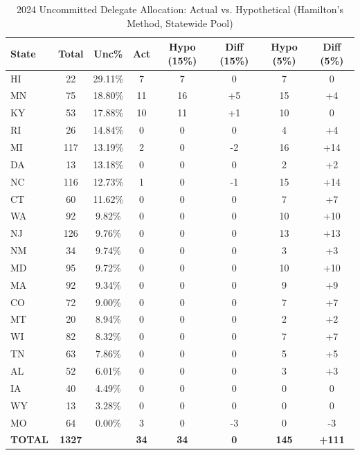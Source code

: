\begin{table}[ht]
\centering
\begin{tabular}{|l|c|c|c|c|c|c|c|}
\hline
\textbf{State} & \textbf{Total} & \textbf{Unc\%} & \textbf{Act} & \textbf{Hypo (15\%)} & \textbf{Diff (15\%)} & \textbf{Hypo (5\%)} & \textbf{Diff (5\%)} \\
\hline
HI & 22 & 29.11\% & 7 & 7 & 0 & 7 & 0 \\
MN & 75 & 18.80\% & 11 & 16 & +5 & 15 & +4 \\
KY & 53 & 17.88\% & 10 & 11 & +1 & 10 & 0 \\
RI & 26 & 14.84\% & 0 & 0 & 0 & 4 & +4 \\
MI & 117 & 13.19\% & 2 & 0 & -2 & 16 & +14 \\
DA & 13 & 13.18\% & 0 & 0 & 0 & 2 & +2 \\
NC & 116 & 12.73\% & 1 & 0 & -1 & 15 & +14 \\
CT & 60 & 11.62\% & 0 & 0 & 0 & 7 & +7 \\
WA & 92 & 9.82\% & 0 & 0 & 0 & 10 & +10 \\
NJ & 126 & 9.76\% & 0 & 0 & 0 & 13 & +13 \\
NM & 34 & 9.74\% & 0 & 0 & 0 & 3 & +3 \\
MD & 95 & 9.72\% & 0 & 0 & 0 & 10 & +10 \\
MA & 92 & 9.34\% & 0 & 0 & 0 & 9 & +9 \\
CO & 72 & 9.00\% & 0 & 0 & 0 & 7 & +7 \\
MT & 20 & 8.94\% & 0 & 0 & 0 & 2 & +2 \\
WI & 82 & 8.32\% & 0 & 0 & 0 & 7 & +7 \\
TN & 63 & 7.86\% & 0 & 0 & 0 & 5 & +5 \\
AL & 52 & 6.01\% & 0 & 0 & 0 & 3 & +3 \\
IA & 40 & 4.49\% & 0 & 0 & 0 & 0 & 0 \\
WY & 13 & 3.28\% & 0 & 0 & 0 & 0 & 0 \\
MO & 64 & 0.00\% & 3 & 0 & -3 & 0 & -3 \\
\hline
\textbf{TOTAL} & \textbf{1327} & & \textbf{34} & \textbf{34} & \textbf{0} & \textbf{145} & \textbf{+111} \\
\hline
\end{tabular}
\caption{2024 Uncommitted Delegate Allocation: Actual vs. Hypothetical (Hamilton's Method, Statewide Pool)}
\label{tab:uncommitted_2024}
\end{table}
